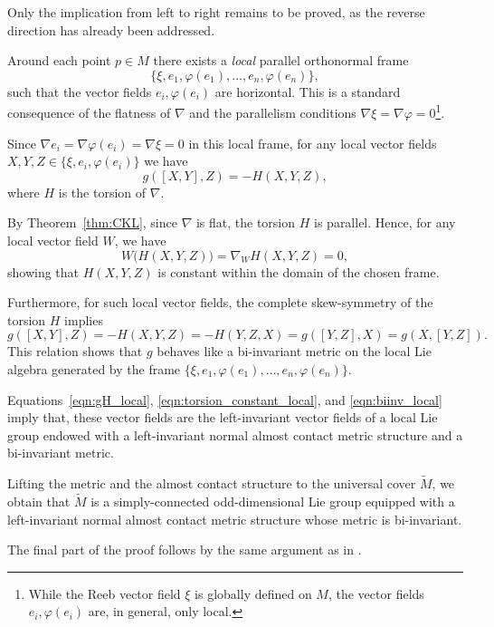 \documentclass{article}
\makeatletter
\renewenvironment{proof}[1][\proofname]{%
  \par\pushQED{\qed}%
  \normalfont\topsep6\p@\@plus6\p@\relax
  \trivlist
  \item[\hskip\labelsep
        \textbf{\textup{#1}}\@addpunct{.}]\ignorespaces
}{%
  \popQED\endtrivlist\@endpefalse
}
\theoremstyle{definition}
\renewcommand{\phi}{\varphi}
\numberwithin{equation}{section}
\makeatother
\begin{document}
\begin{proof}
Only the implication from left to right remains to be proved, as the reverse direction has already been addressed. \par
Around each point $p \in M$ there exists a \emph{local} parallel orthonormal frame
\[
\{\xi, e_1, \phi(e_1), \dots, e_n, \phi(e_n)\},
\]
such that the vector fields $e_i, \phi(e_i)$ are horizontal. 
This is a standard consequence of the flatness of $\nabla$ and the parallelism conditions $\nabla \xi = \nabla \phi = 0$\footnote{While the Reeb vector field $\xi$ is globally defined on $M$, the vector fields $e_i, \phi(e_i)$ are, in general, only local.}. \par

Since $\nabla e_i = \nabla \phi(e_i) = \nabla \xi = 0$ in this local frame, for any local vector fields $X,Y,Z \in \{\xi, e_i, \phi(e_i)\}$ we have
\begin{equation} \label{eqn:gH_local}
g([X,Y],Z) = -H(X,Y,Z),
\end{equation}
where $H$ is the torsion of $\nabla$. 

By Theorem~\ref{thm:CKL}, since $\nabla$ is flat, the torsion $H$ is parallel. 
Hence, for any local vector field $W$, we have
\begin{equation} \label{eqn:torsion_constant_local}
W \big(H(X,Y,Z)\big) = \nabla_W H(X,Y,Z) = 0,
\end{equation}
showing that $H(X,Y,Z)$ is constant within the domain of the chosen frame. \par

Furthermore, for such local vector fields, the complete skew-symmetry of the torsion $H$ implies
\begin{equation} \label{eqn:biinv_local}
g([X,Y],Z) = -H(X,Y,Z) = -H(Y,Z,X) = g([Y,Z],X) = g(X,[Y,Z]).
\end{equation}
This relation shows that $g$ behaves like a bi-invariant metric on the local Lie algebra generated by the frame $\{\xi, e_1, \phi(e_1), \dots, e_n, \phi(e_n)\}$. \par

Equations~\eqref{eqn:gH_local}, \eqref{eqn:torsion_constant_local}, and \eqref{eqn:biinv_local} imply that, these vector fields are the left-invariant vector fields of a local Lie group endowed with a left-invariant normal almost contact metric structure and a bi-invariant metric. 

Lifting the metric and the almost contact structure to the universal cover $\tilde M$, we obtain that $\tilde M$ is a simply-connected odd-dimensional Lie group equipped with a left-invariant normal almost contact metric structure whose metric is bi-invariant. \par
The final part of the proof follows by the same argument as in \cite[Theorem 1]{WYZ}.
\end{proof}
\end{document}
